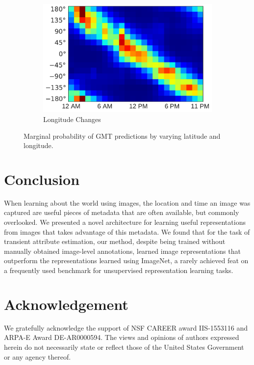 \documentclass{bmvc2k}
\begin{document}
\begin{figure}
\begin{subfigure}[b]{.33\linewidth}
  \end{subfigure}
  \begin{subfigure}[b]{.338\linewidth}
    \includegraphics[width=\linewidth]{time_estimation/49-lon-hour}
    \caption{Longitude Changes}
  \end{subfigure}

  \caption{Marginal probability of GMT predictions by varying latitude
  and longitude.}
  
  \label{fig:hour-change}
\end{figure}


\section{Conclusion}

When learning about the world using images, the location and time an
image was captured are useful pieces of metadata that are often
available, but commonly overlooked. We presented a novel architecture
for learning useful representations from images that takes advantage
of this metadata. We found that for the task of transient attribute
estimation, our method, despite being trained without manually
obtained image-level annotations, learned image representations that
outperform the representations learned using ImageNet, a rarely
achieved feat on a frequently used benchmark for unsupervised
representation learning tasks.

\section*{Acknowledgement}
We gratefully acknowledge the support of NSF CAREER award IIS-1553116 and ARPA-E Award DE-AR0000594. The views and opinions of authors expressed herein do not necessarily state or reflect those of the United States Government or any agency thereof.

{
\small

}

\appendix
\end{document}
